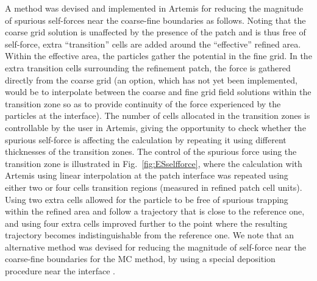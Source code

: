 A method was devised and implemented in Artemis for reducing the magnitude of spurious self-forces near the coarse-fine boundaries as follows. Noting that the coarse grid solution is unaffected by the presence of the patch and is thus free of self-force, extra ``transition'' cells  are added around the ``effective'' refined area.
Within the effective area, the particles gather the potential in the fine grid. In the extra transition cells surrounding the refinement patch, the force is gathered directly from the coarse grid (an option, which has not yet been implemented, would be to interpolate between the coarse and fine grid field solutions within the transition zone so as to provide continuity of the force experienced by the particles at the interface). The number of cells allocated in the transition zones is controllable by the user in Artemis, giving the opportunity to check whether the spurious self-force is affecting the calculation by repeating it using different thicknesses of the transition zones. The control of the spurious force using the transition zone is illustrated in Fig.~\ref{fig:ESselfforce}, where the calculation with Artemis using linear interpolation at the patch interface was repeated using either two or four cells transition regions (measured in refined patch cell units). Using two extra cells allowed for the particle to be free of spurious trapping within the refined area and follow a trajectory that is close to the reference one, and using four extra cells improved further to the point where the resulting trajectory becomes indistinguishable from the reference one.
We note that an alternative method was devised for reducing the magnitude of self-force near the coarse-fine boundaries for the MC method, by using a special deposition procedure near the interface \cite{Colellajcp2010}.


